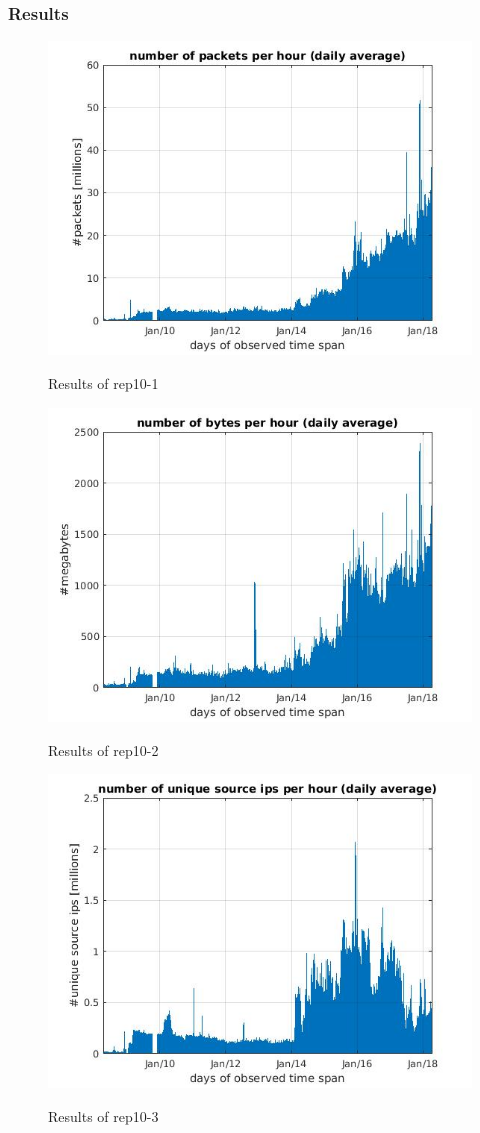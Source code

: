 \subsubsection*{Results}
\begin{figure}[H]
\center
\includegraphics[width=.7\textwidth]{./chapters/plots/rep10_1.jpg}\\
\caption{Results of rep10-1}
\end{figure}
\begin{figure}[H]
\center
\includegraphics[width=.7\textwidth]{./chapters/plots/rep10_2.jpg}\\
\caption{Results of rep10-2}
\end{figure}
\begin{figure}[H]
\center
\includegraphics[width=.7\textwidth]{./chapters/plots/rep10_3.jpg}\\
\caption{Results of rep10-3}
\end{figure}
